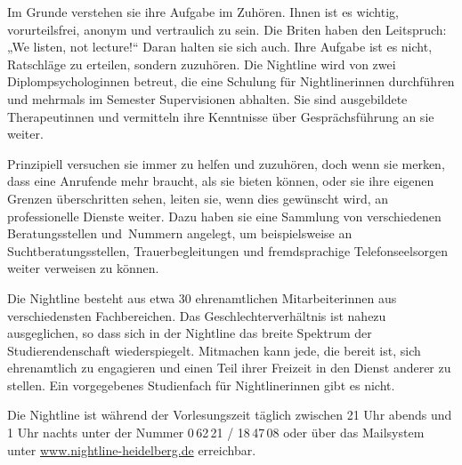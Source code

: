 Im Grunde verstehen sie ihre Aufgabe im Zuhören. Ihnen ist es wichtig, vorurteilsfrei, anonym und vertraulich zu sein. Die Briten haben den Leitspruch: „We listen, not lecture!“ Daran halten sie sich auch. Ihre Aufgabe ist es nicht, Ratschläge zu erteilen, sondern zuzuhören. Die Nightline wird von zwei Diplompsychologinnen betreut, die eine Schulung für Nightlinerinnen durchführen und mehrmals im Semester Supervisionen abhalten. Sie sind ausgebildete Therapeutinnen und vermitteln ihre Kenntnisse über Gesprächsführung an sie weiter.

Prinzipiell versuchen sie immer zu helfen und zuzuhören, doch wenn sie merken, dass eine Anrufende mehr braucht, als sie bieten können, oder sie ihre eigenen Grenzen überschritten sehen, leiten sie, wenn dies gewünscht wird, an professionelle Dienste weiter. Dazu haben sie eine Sammlung von verschiedenen Beratungsstellen und~Nummern angelegt, um beispielsweise an Suchtberatungsstellen, Trauerbegleitungen und fremdsprachige Telefonseelsorgen weiter verweisen zu können.

Die Nightline besteht aus etwa 30 ehrenamtlichen Mitarbeiterinnen aus verschiedensten Fachbereichen. Das Geschlechterverhältnis ist nahezu ausgeglichen, so dass sich in der Nightline das breite Spektrum der Studierendenschaft wiederspiegelt. Mitmachen kann jede, die bereit ist, sich ehrenamtlich zu engagieren und einen Teil ihrer Freizeit in den Dienst anderer zu stellen. Ein vorgegebenes Studienfach für Nightlinerinnen gibt es nicht.

Die Nightline ist während der Vorlesungszeit täglich zwischen 21 Uhr abends und 1 Uhr nachts unter der Nummer 0\,62\,21 / 18\,47\,08 oder über das Mailsystem unter \url{www.nightline-heidelberg.de} erreichbar.
